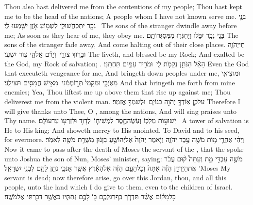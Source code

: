 {Thou also hast delivered me from the contentions of my people; Thou hast kept me to be the head of the nations; A people whom I have not known serve me.}
{בְּנֵ֥י נֵכָ֖ר יִתְכַּחֲשׁוּ\maqqaf לִ֑י לִשְׁמ֥וֹעַ אֹ֖זֶן יִשָּׁ֥מְעוּ לִֽי׃ \setuma }
{The sons of the stranger dwindle away before me; As soon as they hear of me, they obey me.}
{בְּנֵ֥י נֵכָ֖ר יִבֹּ֑לוּ וְיַחְגְּר֖וּ מִמִּסְגְּרוֹתָֽם׃}
{The sons of the stranger fade away, And come halting out of their close places.}
{חַי\maqqaf יְהֹוָ֖ה וּבָר֣וּךְ צוּרִ֑י \setuma  וְיָרֻ֕ם אֱלֹהֵ֖י צ֥וּר יִשְׁעִֽי׃}
{The \lord\space liveth, and blessed be my Rock; And exalted be the God, my Rock of salvation; .}
{הָאֵ֕ל הַנֹּתֵ֥ן נְקָמֹ֖ת לִ֑י \setuma  וּמֹרִ֥יד עַמִּ֖ים תַּחְתֵּֽנִי׃}
{Even the God that executeth vengeance for me, And bringeth down peoples under me,}
{וּמוֹצִיאִ֖י מֵאֹֽיְבָ֑י וּמִקָּמַי֙ תְּר֣וֹמְמֵ֔נִי \setuma  מֵאִ֥ישׁ חֲמָסִ֖ים תַּצִּילֵֽנִי׃}
{And that bringeth me forth from mine enemies; Yea, Thou liftest me up above them that rise up against me; Thou deliverest me from the violent man.}
{עַל\maqqaf כֵּ֛ן אֽוֹדְךָ֥ יְהֹוָ֖ה בַּגּוֹיִ֑ם \setuma  וּלְשִׁמְךָ֖ אֲזַמֵּֽר׃}
{Therefore I will give thanks unto Thee, O \lord, among the nations, And will sing praises unto Thy name.}
{ יְשׁוּע֣וֹת מַלְכּ֑וֹ וְעֹֽשֶׂה\maqqaf חֶ֧סֶד לִמְשִׁיח֛וֹ \setuma  לְדָוִ֥ד וּלְזַרְע֖וֹ עַד\maqqaf עוֹלָֽם׃ \petucha }
{A tower of salvation is He to His king; And showeth mercy to His anointed, To David and to his seed, for evermore.}
\label{haft_54}
\setcounter{chap}{1}
\setcounter{verse}{1}
{וַֽיְהִ֗י אַחֲרֵ֛י מ֥וֹת מֹשֶׁ֖ה עֶ֣בֶד יְהֹוָ֑ה וַיֹּ֤אמֶר יְהֹוָה֙ אֶל\maqqaf יְהוֹשֻׁ֣עַ בִּן\maqqaf נ֔וּן מְשָׁרֵ֥ת מֹשֶׁ֖ה לֵאמֹֽר׃}
{Now it came to pass after the death of Moses the servant of the \lord, that the \lord\space spoke unto Joshua the son of Nun, Moses’ minister, saying:}
{מֹשֶׁ֥ה עַבְדִּ֖י מֵ֑ת וְעַתָּה֩ ק֨וּם עֲבֹ֜ר אֶת\maqqaf הַיַּרְדֵּ֣ן הַזֶּ֗ה אַתָּה֙ וְכׇל\maqqaf הָעָ֣ם הַזֶּ֔ה אֶל\maqqaf הָאָ֕רֶץ אֲשֶׁ֧ר אָנֹכִ֛י נֹתֵ֥ן לָהֶ֖ם לִבְנֵ֥י יִשְׂרָאֵֽל׃}
{’Moses My servant is dead; now therefore arise, go over this Jordan, thou, and all this people, unto the land which I do give to them, even to the children of Israel.}
{כׇּל\maqqaf מָק֗וֹם אֲשֶׁ֨ר תִּדְרֹ֧ךְ כַּֽף\maqqaf רַגְלְכֶ֛ם בּ֖וֹ לָכֶ֣ם נְתַתִּ֑יו כַּאֲשֶׁ֥ר דִּבַּ֖רְתִּי אֶל\maqqaf מֹשֶֽׁה׃}
